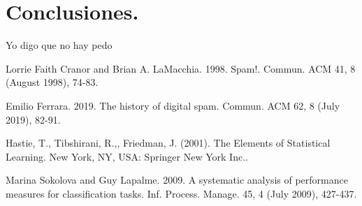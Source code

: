 \documentclass[12pt, letterpaper]{article}
\begin{document}
\section{Conclusiones.}
Yo digo que no hay pedo

\begin{thebibliography}{1}

Lorrie Faith Cranor and Brian A. LaMacchia. 1998. Spam!. Commun. ACM 41, 8 (August 1998), 74-83. 

Emilio Ferrara. 2019. The history of digital spam. Commun. ACM 62, 8 (July 2019), 82-91. 

Hastie, T., Tibshirani, R.,, Friedman, J. (2001). The Elements of Statistical Learning. New York, NY, USA: Springer New York Inc.. 

Marina Sokolova and Guy Lapalme. 2009. A systematic analysis of performance measures for classification tasks. Inf. Process. Manage. 45, 4 (July 2009), 427-437. 

\end{thebibliography}
\end{document}
